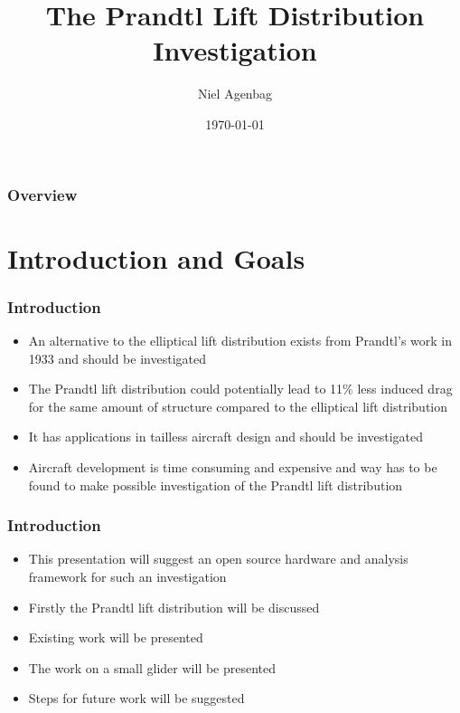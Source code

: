 \documentclass{beamer}
\title[Prandtl Investigation]{The Prandtl Lift Distribution Investigation} %
\author{Niel Agenbag} %
\institute[Unaffiliated] %
{
Unaffiliated \\ %
\medskip
\textit{Ludwigprandtlwing@gmail.com} %
}
\date{\today} %
\begin{document}
\begin{frame}
\titlepage %
\end{frame}

\begin{frame}
\frametitle{Overview} %
\tableofcontents %
\end{frame}


\section{Introduction and Goals}

\begin{frame}
\frametitle{Introduction}
\begin{itemize}
\item An alternative to the elliptical lift distribution exists from Prandtl's work in 1933 \cite{Prandtl1933} and should be investigated 
\item The Prandtl lift distribution could potentially lead to 11\% less induced drag for the same amount of structure compared to the elliptical lift distribution
\item It has applications in tailless aircraft design and should be investigated
\item Aircraft development is time consuming and expensive and way has to be found to make possible investigation of the Prandtl lift distribution
\end{itemize}
\end{frame}

\begin{frame}
\frametitle{Introduction}
\begin{itemize}
\item This presentation will suggest an open source hardware and analysis framework for such an investigation 
\item Firstly the Prandtl lift distribution will be discussed
\item Existing work will be presented
\item The work on a small glider will be presented
\item Steps for future work will be suggested
\end{itemize}
\end{frame}
\end{document}

